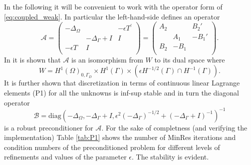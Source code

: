 \documentclass[r]{siamart171218}
\begin{document}
In the following it will be convenient to work with the operator form of
\eqref{eq:coupled_weak}. In particular the left-hand-side defines an operator
%
\begin{equation}\label{eq:operator2d}
  \mathcal{A} = \begin{pmatrix}
    -\Delta_{\Omega} & & -\epsilon T^{\prime}\\
    & -\Delta_{\Gamma} + I & I\\
    -\epsilon T & I & \\
  \end{pmatrix} =
  \begin{pmatrix}
    A_2 &  & B_2'\\
    & A_1 & -B_1'\\
    B_2 & -B_1 & \\
   \end{pmatrix}.
\end{equation}
In \cite{kuchta2016preconditioners} it is shown that $\mathcal{A}$ is an
isomorphism from $W$ to its dual space where
\[
W=H^1(\Omega)_{0, \Gamma_D}\times H^1{(\Gamma)}\times(\epsilon H^{-1/2}(\Gamma)\cap H^{-1}(\Gamma)).
\]
It is further shown that discretization in terms of continuous linear Lagrange
elements (P1) for all the unknowns is inf-sup stable and in turn the diagonal operator
\begin{equation}\label{eq:P1_precond}
\mathcal{B}=\text{diag}(-\Delta_{\Omega}, -\Delta_{\Gamma}+I, \epsilon^2(-\Delta_{\Gamma})^{-1/2}+(-\Delta_{\Gamma}+I)^{-1})^{-1}
\end{equation}
is a robust preconditioner for $\mathcal{A}$. For the sake of completness
(and verifying the implementation) Table \ref{tab:P1} shows the number of
MinRes iterations and condition numbers of the preconditioned problem for
different levels of refinements and values of the parameter $\epsilon$. The
stability is evident.
%
\end{document}
